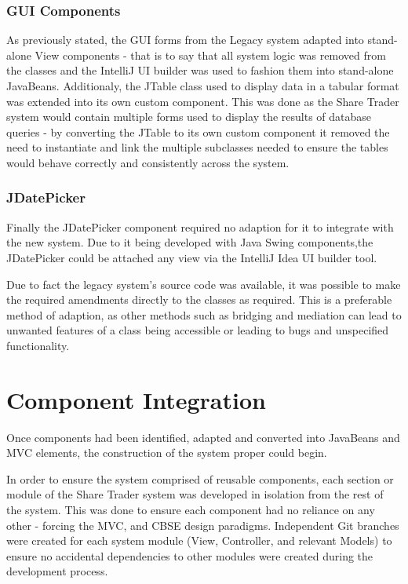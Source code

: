 \documentclass[12pt, a4paper,titlepage]{article}
\begin{document}
\subsubsection{GUI Components}
As previously stated, the GUI forms from the Legacy system adapted into
stand-alone View components - that is to say that all system logic was removed
from the classes and the IntelliJ UI builder was used to fashion them into
stand-alone JavaBeans.  
Additionaly, the JTable class used to display data in a tabular format was
extended into its own custom component.  
This was done as the Share Trader system would contain multiple forms used to
display the results of database queries - by converting the JTable to its own
custom component it removed the need to instantiate and link the multiple
subclasses needed to ensure the tables would behave correctly and consistently
across the system.

\subsubsection{JDatePicker}
Finally the JDatePicker component required no adaption for it to integrate
with the new system. Due to it being developed with Java Swing components,the
JDatePicker could be attached any view via the IntelliJ Idea UI builder tool.

Due to fact the legacy system’s source code was available, it was possible to
make the required amendments directly to the classes as required. 
This is a preferable method of adaption, as other methods such as bridging and
mediation can lead to unwanted features of a class being accessible or leading
to bugs and unspecified functionality.


\section{Component Integration}
Once components had been identified, adapted and converted into JavaBeans and
MVC elements, the construction of the system proper could begin.
 
In order to ensure the system comprised of reusable components, each section
or module of the Share Trader system was developed in isolation from the rest
of the system. 
This was done to ensure  each component had no reliance on any
other - forcing the MVC, and CBSE  design paradigms.  
Independent Git branches were created for each system module (View,
Controller, and relevant Models) to ensure no accidental dependencies to other
modules were created during the development process.
\end{document}
